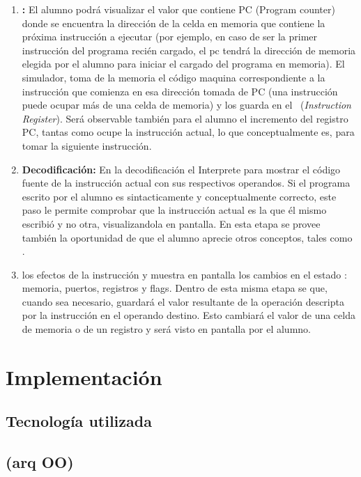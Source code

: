 \begin{enumerate}
\item \textbf{:} El alumno podrá visualizar el valor que contiene PC (Program counter) donde se encuentra la dirección de la celda en memoria que contiene la próxima instrucción a ejecutar (por ejemplo, en caso de ser la primer instrucción del programa recién cargado, el pc tendrá la dirección de memoria elegida por el alumno para iniciar el cargado del programa en memoria). El simulador, toma de la memoria el código maquina correspondiente a la instrucción que comienza en esa dirección tomada de PC (una instrucción puede ocupar más de una celda de memoria) y los guarda en el \IR\ (\textit{Instruction Register}). Será observable también para el alumno el incremento del registro PC, tantas como  ocupe la instrucción actual, lo que conceptualmente es,  para tomar la siguiente instrucción.

\item  \textbf{Decodificación:}
En la decodificación el Interprete para mostrar el código fuente de la instrucción actual con sus respectivos operandos. Si el programa escrito por el alumno es sintacticamente y conceptualmente correcto, este paso le permite comprobar que la instrucción actual es la que él mismo escribió y no otra, visualizandola en pantalla. En esta etapa se provee también la oportunidad de que el alumno aprecie otros conceptos, tales como .

\item  \textbf{}
 los efectos de la instrucción y muestra en pantalla los cambios en el estado : memoria, puertos, registros y flags. Dentro de esta misma etapa se  que, cuando sea necesario, guardará el valor resultante de la operación descripta por la instrucción en el operando destino. Esto cambiará el valor de una celda de memoria o de un registro y será visto en pantalla por el alumno.
\end{enumerate}


\section{Implementación}
\subsection{Tecnología utilizada}
\subsection{ (arq OO)}



